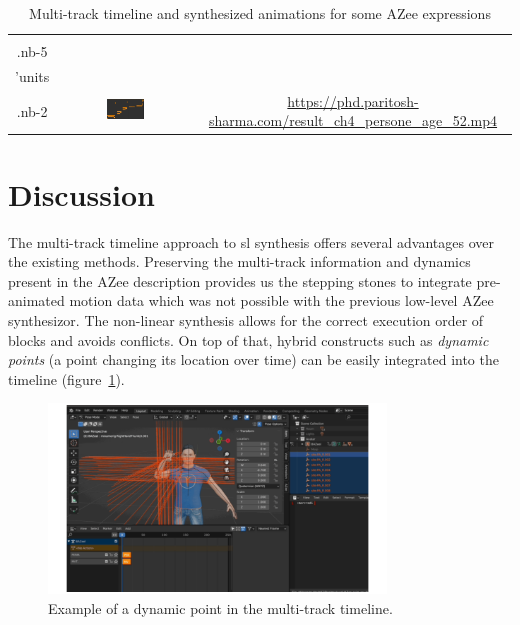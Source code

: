 \documentclass[../../main.tex]{subfiles}
\begin{document}
\begin{table}[h]
\begin{tabular}{|c|c|c|}
{{              \hspace{1.5cm} 'tens \\
              \hspace{1.5cm} .nb-5 \\
              \hspace{1.5cm} 'units \\
              \hspace{1.5cm} .nb-2}} & \includegraphics[width=0.3\textwidth]{chapters/multi_track/images/result_ch4_persone_age_52_timeline.png} & \url{https://phd.paritosh-sharma.com/result_ch4_persone_age_52.mp4} \\
        \hline
    \end{tabular}
    \caption{Multi-track timeline and synthesized animations for some AZee expressions}
    \label{tab:azee_to_blender}
\end{table}


\section{Discussion}
\label{ch:multi_track:discussion}

The multi-track timeline approach to \gls{sl} synthesis offers several advantages over the existing methods. Preserving the multi-track information and dynamics present in the AZee description provides us the stepping stones to integrate pre-animated motion data which was not possible with the previous low-level AZee synthesizor. The non-linear synthesis allows for the correct execution order of blocks and avoids conflicts. On top of that, hybrid constructs such as \emph{dynamic points} (a point changing its location over time) can be easily integrated into the timeline (figure~\ref{fig:dynpoint_example}).

\begin{figure}[h]
    \centering
    \includegraphics[width=0.8\textwidth]{chapters/multi_track/images/dynpoint_example.png}
    \caption{Example of a dynamic point in the multi-track timeline.}
    \label{fig:dynpoint_example}
\end{figure}
\end{document}
